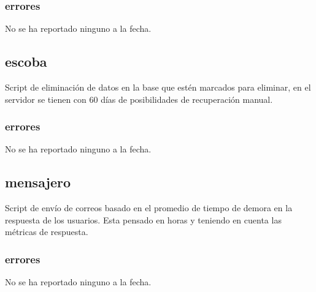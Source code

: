 \documentclass[10pt,a4paper]{book}
\begin{document}
	\subsubsection{errores}
	No se ha reportado ninguno a la fecha.
	
	\subsection{escoba}
	Script de eliminación de datos en la base que estén marcados para eliminar, en el servidor se tienen con 60 días de posibilidades de recuperación manual.
	\subsubsection{errores}
	No se ha reportado ninguno a la fecha.
	
	\subsection{mensajero}
	Script de envío de correos basado en el promedio de tiempo de demora en la respuesta de los usuarios. Esta pensado en horas y teniendo en cuenta las métricas de respuesta.  
	\subsubsection{errores}
	No se ha reportado ninguno a la fecha.
	
	
\end{document}
